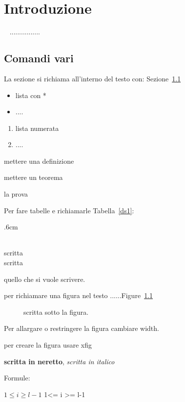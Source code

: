 
\chapter{Introduzione}~\label{introduzione}
................

\section{Comandi vari}\label{comandi}


La sezione si richiama all'interno del testo con: Sezione~\ref{comandi}


\begin{itemize}
\item lista con *
\item ....
\end{itemize}


\begin{enumerate}
\item lista numerata
\item ....
\end{enumerate}

\begin{definition}
mettere una definizione
\end{definition}

\begin{teo}
mettere un teorema
\end{teo}
\pf la prova
\ep


Per fare tabelle e richiamarle Tabella~\ref{ds1}: 


\begin{table}
\baselineskip .6cm

\hrulefill

{\small

\begin{minipage}[c]{0.3\linewidth}

\begin{tabbing}
\\
scritta \\
scritta \\
\end{tabbing}
\end{minipage}

\hrulefill
\caption{ quello che si vuole scrivere.} \label{ds1}
}
\end{table}



per richiamare una figura nel testo ......Figure~\ref{etichettafigura}


\begin{figure}
 \centering {}
 \caption{scritta sotto la figura.\label{etichettafigura}}
 \end{figure}

Per allargare o restringere la figura cambiare width.

per creare la figura usare xfig \newline



{\bf scritta in neretto}, {\em scritta in italico}\newline



Formule:


$1\leq i\geq l-1$  1<= i >= l-1



